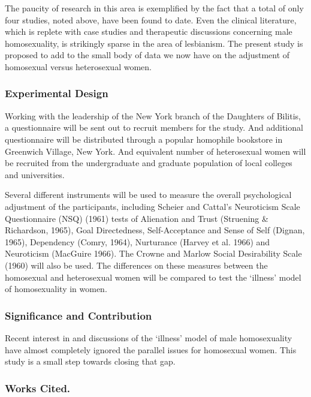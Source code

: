 \begin{refsection}
The paucity of research in this area is exemplified by the fact that a total of only four studies, noted above, have been found to date. Even the clinical literature, which is replete with case studies and therapeutic discussions concerning male homosexuality, is strikingly sparse in the area of lesbianism. The present study is proposed to add to the small body of data we now have on the adjustment of homosexual versus heterosexual women.

\subsubsection{Experimental Design}
\label{experimentaldesign}

Working with the leadership of the New York branch of the Daughters of Bilitis, a questionnaire will be sent out to recruit members for the study. And additional questionnaire will be distributed through a popular homophile bookstore in Greenwich Village, New York. And equivalent number of heterosexual women will be recruited from the undergraduate and graduate population of local colleges and universities.

Several different instruments will be used to measure the overall psychological adjustment of the participants, including Scheier and Cattal's Neuroticism Scale Questionnaire (NSQ) (1961) tests of Alienation and Trust (Struening \& Richardson, 1965), Goal Directedness, Self-Acceptance and Sense of Self (Dignan, 1965), Dependency (Comry, 1964), Nurturance (Harvey et al. 1966) and Neuroticism (MacGuire 1966). The Crowne and Marlow Social Desirability Scale (1960) will also be used. The differences on these measures between the homosexual and heterosexual women will be compared to test the `illness' model of homosexuality in women.

\subsubsection{Significance and Contribution}
\label{significanceandcontribution}

Recent interest in and discussions of the `illness' model of male homosexuality have almost completely ignored the parallel issues for homosexual women. This study is a small step towards closing that gap.

\subsubsection{Works Cited.}
\label{workscited.}


\end{refsection}
